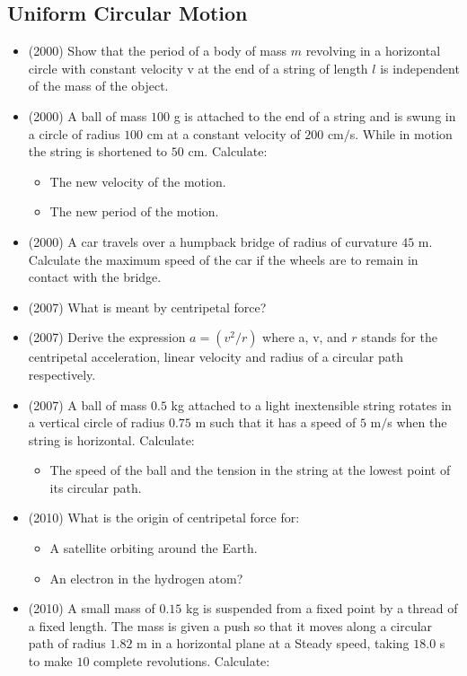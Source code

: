 \documentclass{article}
\begin{document}
\subsection{Uniform Circular Motion}
\begin{itemize}
\item (2000)  Show that the period of a body of mass $ m$ revolving in a horizontal circle with constant velocity v at the end of a string of length $ l$ is independent of the mass of the object.
\item (2000)  A ball of mass $ 100$ g is attached to the end of a string and is swung in a circle of radius $ 100$ cm at a constant velocity of $ 200$ cm$/$s. While in motion the string is shortened to $ 50$ cm. Calculate:\begin{itemize}
\item The new velocity of the motion.
\item The new period of the motion.
\end{itemize}
\item (2000)  A car travels over a humpback bridge of radius of curvature $ 45$ m. Calculate the maximum speed of the car if the wheels are to remain in contact with the bridge.
\item (2007)  What is meant by centripetal force?
\item (2007)  Derive the expression $ a =(v^{2}/r)$ where a, v, and $ r$ stands for the centripetal acceleration, linear velocity and radius of a circular path respectively.  
\item (2007)  A ball of mass $ 0.5$ kg attached to a light inextensible string rotates in a vertical circle of radius $ 0.75$ m such that it has a speed of $ 5$ m$/$s when the string is horizontal.  Calculate:\begin{itemize}
\item  The speed of the ball and the tension in the string at the lowest point of its circular path.
\end{itemize}
\item (2010)  What is the origin of centripetal force for:\begin{itemize}
\item A satellite orbiting around the Earth. 
\item An electron in the hydrogen atom?
\end{itemize}
\item (2010)  A small mass of $ 0.15$ kg is suspended from a fixed point by a thread of a fixed length. The mass is given a push so that it moves along a circular path of radius $ 1.82$ m in a horizontal plane at a Steady speed, taking $ 18.0$ s to make $ 10$ complete revolutions. Calculate:\begin{itemize}

\end{itemize}
\end{itemize}
\end{document}
